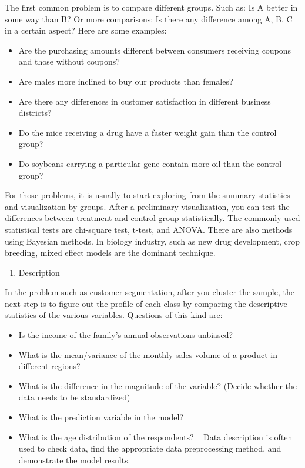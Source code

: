 \documentclass[]{book}
\providecommand{\tightlist}{%
  \setlength{\itemsep}{0pt}\setlength{\parskip}{0pt}}
\theoremstyle{definition}
\theoremstyle{definition}
\theoremstyle{remark}
\begin{document}
The first common problem is to compare different groups. Such as: Is A
better in some way than B? Or more comparisons: Is there any difference
among A, B, C in a certain aspect? Here are some examples:

\begin{itemize}
\tightlist
\item
  Are the purchasing amounts different between consumers receiving
  coupons and those without coupons?
\item
  Are males more inclined to buy our products than females?
\item
  Are there any differences in customer satisfaction in different
  business districts?
\item
  Do the mice receiving a drug have a faster weight gain than the
  control group?
\item
  Do soybeans carrying a particular gene contain more oil than the
  control group?
\end{itemize}

For those problems, it is usually to start exploring from the summary
statistics and visualization by groups. After a preliminary
visualization, you can test the differences between treatment and
control group statistically. The commonly used statistical tests are
chi-square test, t-test, and ANOVA. There are also methods using
Bayesian methods. In biology industry, such as new drug development,
crop breeding, mixed effect models are the dominant technique.

\begin{enumerate}
\def\labelenumi{\arabic{enumi}.}
\setcounter{enumi}{1}
\tightlist
\item
  Description
\end{enumerate}

In the problem such as customer segmentation, after you cluster the
sample, the next step is to figure out the profile of each class by
comparing the descriptive statistics of the various variables. Questions
of this kind are:

\begin{itemize}
\tightlist
\item
  Is the income of the family's annual observations unbiased?
\item
  What is the mean/variance of the monthly sales volume of a product in
  different regions?
\item
  What is the difference in the magnitude of the variable? (Decide
  whether the data needs to be standardized)
\item
  What is the prediction variable in the model?
\item
  What is the age distribution of the respondents? ~ Data description is
  often used to check data, find the appropriate data preprocessing
  method, and demonstrate the model results.
\end{itemize}
\end{document}
